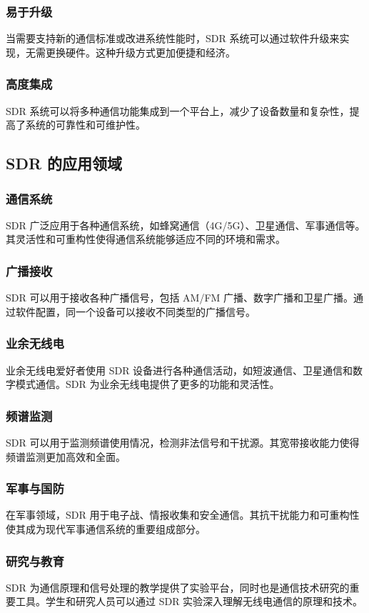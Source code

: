 \documentclass[UTF8]{ctexbook}
\begin{document}
\subsubsection{易于升级}
当需要支持新的通信标准或改进系统性能时，SDR 系统可以通过软件升级来实现，无需更换硬件。这种升级方式更加便捷和经济。

\subsubsection{高度集成}
SDR 系统可以将多种通信功能集成到一个平台上，减少了设备数量和复杂性，提高了系统的可靠性和可维护性。

\subsection{SDR 的应用领域}
\subsubsection{通信系统}
SDR 广泛应用于各种通信系统，如蜂窝通信（4G/5G）、卫星通信、军事通信等。其灵活性和可重构性使得通信系统能够适应不同的环境和需求。

\subsubsection{广播接收}
SDR 可以用于接收各种广播信号，包括 AM/FM 广播、数字广播和卫星广播。通过软件配置，同一个设备可以接收不同类型的广播信号。

\subsubsection{业余无线电}
业余无线电爱好者使用 SDR 设备进行各种通信活动，如短波通信、卫星通信和数字模式通信。SDR 为业余无线电提供了更多的功能和灵活性。

\subsubsection{频谱监测}
SDR 可以用于监测频谱使用情况，检测非法信号和干扰源。其宽带接收能力使得频谱监测更加高效和全面。

\subsubsection{军事与国防}
在军事领域，SDR 用于电子战、情报收集和安全通信。其抗干扰能力和可重构性使其成为现代军事通信系统的重要组成部分。

\subsubsection{研究与教育}
SDR 为通信原理和信号处理的教学提供了实验平台，同时也是通信技术研究的重要工具。学生和研究人员可以通过 SDR 实验深入理解无线电通信的原理和技术。
\end{document}
